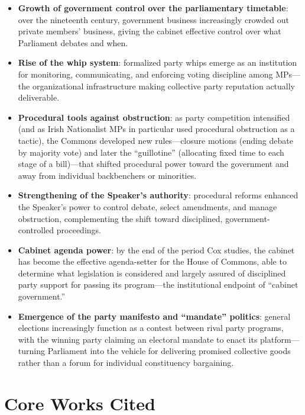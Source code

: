 \documentclass[12pt]{article}
\begin{document}
\begin{itemize}[leftmargin=*, itemsep=4pt]
    \item \textbf{Growth of government control over the parliamentary timetable}: over the nineteenth century, government business increasingly crowded out private members' business, giving the cabinet effective control over what Parliament debates and when.
    \item \textbf{Rise of the whip system}: formalized party whips emerge as an institution for monitoring, communicating, and enforcing voting discipline among MPs---the organizational infrastructure making collective party reputation actually deliverable.
    \item \textbf{Procedural tools against obstruction}: as party competition intensified (and as Irish Nationalist MPs in particular used procedural obstruction as a tactic), the Commons developed new rules---closure motions (ending debate by majority vote) and later the ``guillotine'' (allocating fixed time to each stage of a bill)---that shifted procedural power toward the government and away from individual backbenchers or minorities.
    \item \textbf{Strengthening of the Speaker's authority}: procedural reforms enhanced the Speaker's power to control debate, select amendments, and manage obstruction, complementing the shift toward disciplined, government-controlled proceedings.
    \item \textbf{Cabinet agenda power}: by the end of the period Cox studies, the cabinet has become the effective agenda-setter for the House of Commons, able to determine what legislation is considered and largely assured of disciplined party support for passing its program---the institutional endpoint of ``cabinet government.''
    \item \textbf{Emergence of the party manifesto and ``mandate'' politics}: general elections increasingly function as a contest between rival party programs, with the winning party claiming an electoral mandate to enact its platform---turning Parliament into the vehicle for delivering promised collective goods rather than a forum for individual constituency bargaining.
\end{itemize}

\section{Core Works Cited}
\end{document}
